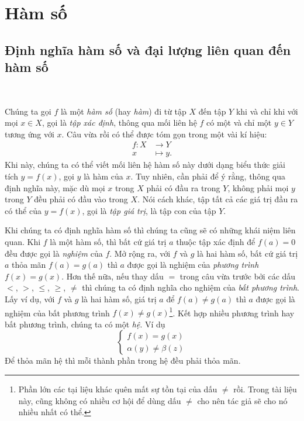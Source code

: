 \section{Hàm số}

\subsection{Định nghĩa hàm số và đại lượng liên quan đến hàm số}

\ %

Chúng ta gọi $f$ là một \emph{hàm số} (hay \emph{hàm}) đi từ tập $X$ đến tập $Y$ khi và chỉ khi với mọi $x\in X$, gọi là \emph{tập xác định}, thông qua mối liên hệ $f$ có một và chỉ một $y\in Y$ tương ứng với $x$. Câu vừa rồi có thể được tóm gọn trong một vài kí hiệu: \begin{align*}f: X &\to Y \\ x &\mapsto y.\end{align*} Khi này, chúng ta có thể viết mối liên hệ hàm số này dưới dạng biểu thức giải tích $y=f(x)$, gọi $y$ là hàm của $x$. Tuy nhiên, cần phải để ý rằng, thông qua định nghĩa này, mặc dù mọi $x$ trong $X$ phải có đầu ra trong $Y$, không phải mọi $y$ trong $Y$ đều phải có đầu vào trong $X$. Nói cách khác, tập tất cả các giá trị đầu ra có thể của $y=f(x)$, gọi là \emph{tập giá trị}, là tập con của tập $Y$.

Khi chúng ta có định nghĩa hàm số thì chúng ta cũng sẽ có những khái niệm liên quan. Khi $f$ là một hàm số, thì bất cứ giá trị $a$ thuộc tập xác định để $f(a) = 0$ đều được gọi là \emph{nghiệm} của $f$. Mở rộng ra, với $f$ và $g$ là hai hàm số, bất cứ giá trị $a$ thỏa mãn $f(a) = g(a)$ thì $a$ được gọi là nghiệm của \emph{phương trình} $f(x) = g(x)$. Hơn thế nữa, nếu thay dấu $=$ trong câu vừa trước bởi các dấu $<$, $>$, $\leq$, $\geq$, $\neq$ thì chúng ta có định nghĩa cho nghiệm của \emph{bất phương trình}. Lấy ví dụ, với $f$ và $g$ là hai hàm số, giá trị $a$ để $f(a) \neq g(a)$ thì $a$ được gọi là nghiệm của bất phương trình $f(x) \neq g(x)$\footnote{Phần lớn các tại liệu khác quên mất sự tồn tại của dấu $\neq$ rồi. Trong tài liệu này, cũng không có nhiều cơ hội để dùng dấu $\neq$ cho nên tác giả sẽ cho nó nhiều  nhất có thể.}. Kết hợp nhiều phương trình hay bất phương trình, chúng ta có một \emph{hệ}. Ví dụ 
$$
\begin{cases}
   f(x) = g(x) \\
   \alpha(y) \neq \beta(z)
\end{cases}
$$
Để thỏa mãn hệ thì mỗi thành phần trong hệ đều phải thỏa mãn.

